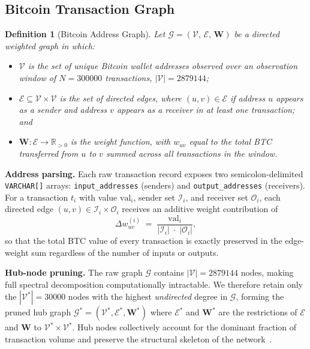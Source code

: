 \documentclass[journal]{IEEEtran}
\newtheorem{definition}{Definition}
\begin{document}
\subsection{Bitcoin Transaction Graph}
\label{subsec:graph}

\begin{definition}[Bitcoin Address Graph]
\label{def:graph}
Let $\mathcal{G} = (\mathcal{V},\,\mathcal{E},\,\mathbf{W})$ be a
\emph{directed weighted graph} in which:
\begin{itemize}
  \item $\mathcal{V}$ is the set of unique Bitcoin wallet addresses observed
        over an observation window of $N = \num{300000}$ transactions,
        $|\mathcal{V}| = \num{2879144}$;
  \item $\mathcal{E} \subseteq \mathcal{V}\times\mathcal{V}$ is the set of
        directed edges, where $(u,v)\in\mathcal{E}$ if address $u$ appears as
        a sender and address $v$ appears as a receiver in at least one
        transaction; and
  \item $\mathbf{W}:\mathcal{E}\to\mathbb{R}_{>0}$ is the weight function,
        with $w_{uv}$ equal to the total BTC transferred from $u$ to $v$
        summed across all transactions in the window.
\end{itemize}
\end{definition}

\noindent\textbf{Address parsing.}
Each raw transaction record exposes two semicolon-delimited
\texttt{VARCHAR[]} arrays: \texttt{input\_addresses} (senders) and
\texttt{output\_addresses} (receivers).
For a transaction $t_i$ with value $\mathrm{val}_i$, sender set
$\mathcal{I}_i$, and receiver set $\mathcal{O}_i$, each directed edge
$(u,v)\in\mathcal{I}_i\times\mathcal{O}_i$ receives an additive weight
contribution of
\begin{equation}
  \Delta w_{uv}^{(i)}
    \;=\;
    \frac{\mathrm{val}_i}{|\mathcal{I}_i|\;\cdot\;|\mathcal{O}_i|},
  \label{eq:edge_weight}
\end{equation}
so that the total BTC value of every transaction is exactly preserved in the
edge-weight sum regardless of the number of inputs or outputs.

\noindent\textbf{Hub-node pruning.}
The raw graph $\mathcal{G}$ contains $|\mathcal{V}| = \num{2879144}$ nodes,
making full spectral decomposition computationally intractable.
We therefore retain only the $|\mathcal{V}^{*}| = \num{30000}$ nodes with
the highest \emph{undirected} degree in $\mathcal{G}$, forming the pruned
hub graph $\mathcal{G}^{*} = (\mathcal{V}^{*}, \mathcal{E}^{*}, \mathbf{W}^{*})$
where $\mathcal{E}^{*}$ and $\mathbf{W}^{*}$ are the restrictions of
$\mathcal{E}$ and $\mathbf{W}$ to $\mathcal{V}^{*}\times\mathcal{V}^{*}$.
Hub nodes collectively account for the dominant fraction of transaction volume
and preserve the structural skeleton of the network~\cite{Leskovec2007}.
\end{document}
